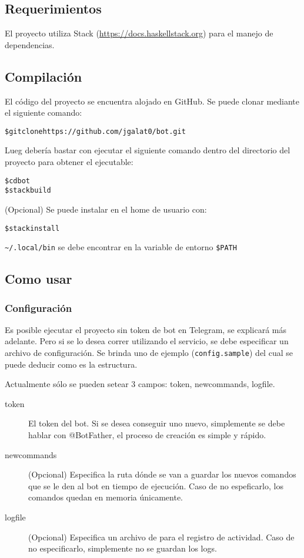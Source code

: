 \documentclass[12pt,a4paper,final]{article}
\begin{document}
\subsection{Requerimientos}
El proyecto utiliza Stack (\url{https://docs.haskellstack.org}) para el manejo de dependencias.

\subsection{Compilación}
El código del proyecto se encuentra alojado en GitHub. Se puede clonar mediante el siguiente comando:

\begin{alltt}
\$ git clone https://github.com/jgalat0/bot.git
\end{alltt}

Lueg debería bastar con ejecutar el siguiente comando dentro del directorio del proyecto para obtener el ejecutable:

\begin{alltt}
\$ cd bot
\$ stack build
\end{alltt}

\clearpage
(Opcional) Se puede instalar en el home de usuario con:
\begin{alltt}
\$ stack install
\end{alltt}
\texttt{\textasciitilde/.local/bin} se debe encontrar en la variable de entorno \texttt{\$PATH}

\subsection{Como usar}

\subsubsection{Configuración}
Es posible ejecutar el proyecto sin token de bot en Telegram, se explicará más adelante. Pero si se lo desea correr utilizando el servicio, se debe especificar un archivo de configuración. Se brinda uno de ejemplo (\texttt{config.sample}) del cual se puede deducir como es la estructura. 

Actualmente sólo se pueden setear 3 campos: token, newcommands, logfile.

\begin{description}
\item [token] El token del bot. Si se desea conseguir uno nuevo, simplemente se debe hablar con @BotFather, el proceso de creación es simple y rápido.
\item [newcommands] (Opcional) Especifica la ruta dónde se van a guardar los nuevos comandos que se le den al bot en tiempo de ejecución. Caso de no espeficarlo, los comandos quedan en memoria únicamente.
\item [logfile] (Opcional) Especifica un archivo de para el registro de actividad. Caso de no especificarlo, simplemente no se guardan los logs.
\end{description}
\end{document}
